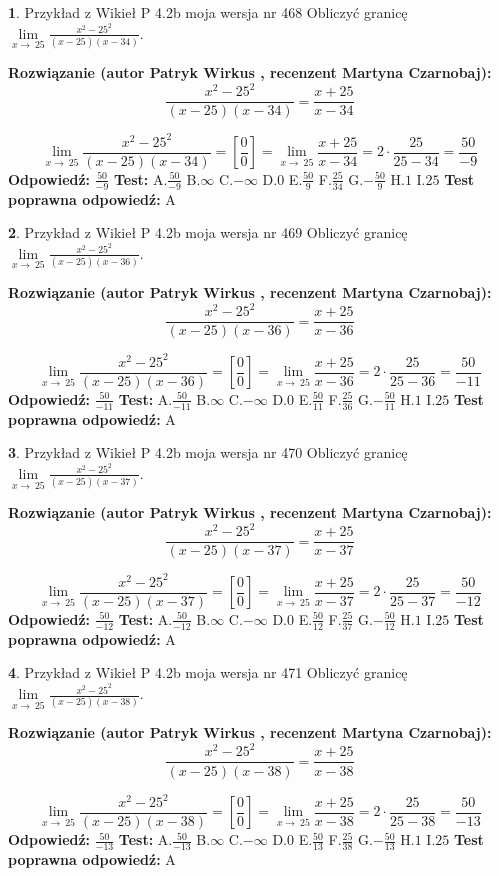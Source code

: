 \documentclass[12pt, a4paper]{article}
\theoremstyle{definition} %
\newtheorem{zad}{}
\newcommand{\zadStart}[1]{\begin{zad}#1\newline}
\newcommand{\zadStop}{\end{zad}}
\newcommand{\rozwStart}[2]{\noindent \textbf{Rozwiązanie (autor #1 , recenzent #2): }\newline}
\newcommand{\rozwStop}{\newline}
\newcommand{\odpStart}{\noindent \textbf{Odpowiedź:}\newline}
\newcommand{\odpStop}{\newline}
\newcommand{\testStart}{\noindent \textbf{Test:}\newline}
\newcommand{\testStop}{\newline}
\newcommand{\kluczStart}{\noindent \textbf{Test poprawna odpowiedź:}\newline}
\newcommand{\kluczStop}{\newline}
\begin{document}
\zadStart{Przykład z Wikieł P 4.2b moja wersja nr 468}
Obliczyć granicę $\lim\limits_{x\to\ 25}\frac{x^{2}-25^{2}}{(x-25)(x-34)}$.
\zadStop
\rozwStart{Patryk Wirkus}{Martyna Czarnobaj}
$$\frac{x^{2}-25^{2}}{(x-25)(x-34)}=\frac{x+25}{x-34}$$

$$\lim\limits_{x\to\ 25}\frac{x^{2}-25^{2}}{(x-25)(x-34)}=[\frac{0}{0}]=\lim\limits_{x\to\ 25}\frac{x+25}{x-34}=2 \cdot \frac{25}{25-34} = \frac{50}{-9}$$
\rozwStop
\odpStart
$\frac{50}{-9}$
\odpStop
\testStart
A.$\frac{50}{-9}$
B.$\infty$
C.$-\infty$
D.$0$
E.$\frac{50}{9}$
F.$\frac{25}{34}$
G.$-\frac{50}{9}$
H.$1$
I.$25$
\testStop
\kluczStart
A
\kluczStop



\zadStart{Przykład z Wikieł P 4.2b moja wersja nr 469}
Obliczyć granicę $\lim\limits_{x\to\ 25}\frac{x^{2}-25^{2}}{(x-25)(x-36)}$.
\zadStop
\rozwStart{Patryk Wirkus}{Martyna Czarnobaj}
$$\frac{x^{2}-25^{2}}{(x-25)(x-36)}=\frac{x+25}{x-36}$$

$$\lim\limits_{x\to\ 25}\frac{x^{2}-25^{2}}{(x-25)(x-36)}=[\frac{0}{0}]=\lim\limits_{x\to\ 25}\frac{x+25}{x-36}=2 \cdot \frac{25}{25-36} = \frac{50}{-11}$$
\rozwStop
\odpStart
$\frac{50}{-11}$
\odpStop
\testStart
A.$\frac{50}{-11}$
B.$\infty$
C.$-\infty$
D.$0$
E.$\frac{50}{11}$
F.$\frac{25}{36}$
G.$-\frac{50}{11}$
H.$1$
I.$25$
\testStop
\kluczStart
A
\kluczStop



\zadStart{Przykład z Wikieł P 4.2b moja wersja nr 470}
Obliczyć granicę $\lim\limits_{x\to\ 25}\frac{x^{2}-25^{2}}{(x-25)(x-37)}$.
\zadStop
\rozwStart{Patryk Wirkus}{Martyna Czarnobaj}
$$\frac{x^{2}-25^{2}}{(x-25)(x-37)}=\frac{x+25}{x-37}$$

$$\lim\limits_{x\to\ 25}\frac{x^{2}-25^{2}}{(x-25)(x-37)}=[\frac{0}{0}]=\lim\limits_{x\to\ 25}\frac{x+25}{x-37}=2 \cdot \frac{25}{25-37} = \frac{50}{-12}$$
\rozwStop
\odpStart
$\frac{50}{-12}$
\odpStop
\testStart
A.$\frac{50}{-12}$
B.$\infty$
C.$-\infty$
D.$0$
E.$\frac{50}{12}$
F.$\frac{25}{37}$
G.$-\frac{50}{12}$
H.$1$
I.$25$
\testStop
\kluczStart
A
\kluczStop



\zadStart{Przykład z Wikieł P 4.2b moja wersja nr 471}
Obliczyć granicę $\lim\limits_{x\to\ 25}\frac{x^{2}-25^{2}}{(x-25)(x-38)}$.
\zadStop
\rozwStart{Patryk Wirkus}{Martyna Czarnobaj}
$$\frac{x^{2}-25^{2}}{(x-25)(x-38)}=\frac{x+25}{x-38}$$

$$\lim\limits_{x\to\ 25}\frac{x^{2}-25^{2}}{(x-25)(x-38)}=[\frac{0}{0}]=\lim\limits_{x\to\ 25}\frac{x+25}{x-38}=2 \cdot \frac{25}{25-38} = \frac{50}{-13}$$
\rozwStop
\odpStart
$\frac{50}{-13}$
\odpStop
\testStart
A.$\frac{50}{-13}$
B.$\infty$
C.$-\infty$
D.$0$
E.$\frac{50}{13}$
F.$\frac{25}{38}$
G.$-\frac{50}{13}$
H.$1$
I.$25$
\testStop
\kluczStart
A
\kluczStop
\end{document}
